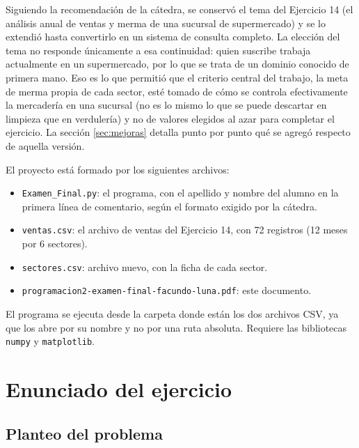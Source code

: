 \documentclass[12pt]{article}
\newcommand{\codigo}[1]{\texttt{\small #1}}
\begin{document}
Siguiendo la recomendación de la cátedra, se conservó el tema del Ejercicio 14 (el análisis anual de ventas y merma de una sucursal de supermercado) y se lo extendió hasta convertirlo en un sistema de consulta completo. La elección del tema no responde únicamente a esa continuidad: quien suscribe trabaja actualmente en un supermercado, por lo que se trata de un dominio conocido de primera mano. Eso es lo que permitió que el criterio central del trabajo, la meta de merma propia de cada sector, esté tomado de cómo se controla efectivamente la mercadería en una sucursal (no es lo mismo lo que se puede descartar en limpieza que en verdulería) y no de valores elegidos al azar para completar el ejercicio. La sección \ref{sec:mejoras} detalla punto por punto qué se agregó respecto de aquella versión.

El proyecto está formado por los siguientes archivos:

\begin{itemize}[leftmargin=1.5em, itemsep=0.2em]
    \item \codigo{Examen\_Final.py}: el programa, con el apellido y nombre del alumno en la primera línea de comentario, según el formato exigido por la cátedra.
    \item \codigo{ventas.csv}: el archivo de ventas del Ejercicio 14, con 72 registros (12 meses por 6 sectores).
    \item \codigo{sectores.csv}: archivo nuevo, con la ficha de cada sector.
    \item \codigo{programacion2-examen-final-facundo-luna.pdf}: este documento.
\end{itemize}

El programa se ejecuta desde la carpeta donde están los dos archivos CSV, ya que los abre por su nombre y no por una ruta absoluta. Requiere las bibliotecas \codigo{numpy} y \codigo{matplotlib}.

\newpage

\section{Enunciado del ejercicio}

\subsection{Planteo del problema}
\end{document}
